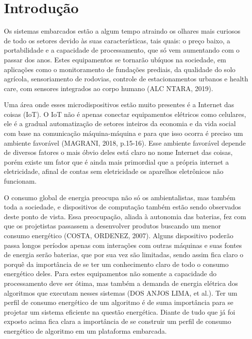 \chapter{Introdução}\label{CAP:introducao}

Os sistemas embarcados estão a algum tempo atraindo os olhares mais curiosos de todo os  setores devido às suas características, tais quais: o preço baixo, a portabilidade e a capacidade de processamento, que só vem aumentando com o passar dos anos. Estes equipamentos se tornarão ubíquos na sociedade, em aplicações como o monitoramento de fundações prediais, da qualidade do solo agrícola, sensoriamento de rodovias, controle de estacionamentos urbanos e health care, com sensores integrados ao corpo humano (ALC NTARA, 2019). 

Uma área onde esses microdispositivos estão muito presentes é a Internet das coisas (IoT). O IoT não é apenas conectar equipamentos elétricos como celulares, ele é a gradual automatização de setores inteiros da economia e da vida social com base na comunicação  máquina-máquina e para que isso ocorra é preciso um ambiente favorável (MAGRANI, 2018, p.15-16). Esse ambiente favorável depende de diversos fatores o mais óbvio deles está claro no nome Internet das coisas,  porém existe um fator que é ainda mais primordial que a própria internet a eletricidade, afinal de contas sem eletricidade os aparelhos eletrônicos não funcionam. 

O consumo global de energia preocupa não só os ambientalistas, mas também toda a sociedade, e dispositivos de computação também estão sendo observados deste ponto de vista. Essa preocupação, aliada à autonomia das baterias, fez com que os projetistas passassem a desenvolver produtos buscando um menor consumo energético (COSTA, ORDENEZ, 2007). Alguns dispositivo poderão passa longos períodos apenas com interações com outras máquinas e suas fontes de energia serão  baterias, que por sua vez são limitadas, sendo assim fica claro o porquê da importância de se ter um conhecimento claro de todo o consumo energético deles. Para estes equipamentos não somente a capacidade do processamento deve ser ótima, mas também a demanda de energia elétrica dos algoritmos que executam nesses sistemas (DOS ANJOS LIMA, et al.). Ter um perfil de consumo energético de um algoritmo é de suma importância para se projetar um sistema eficiente na questão energética. Diante de tudo que já foi exposto acima fica clara a importância de se construir um perfil de consumo energético de algoritmo em um plataforma embarcada.

